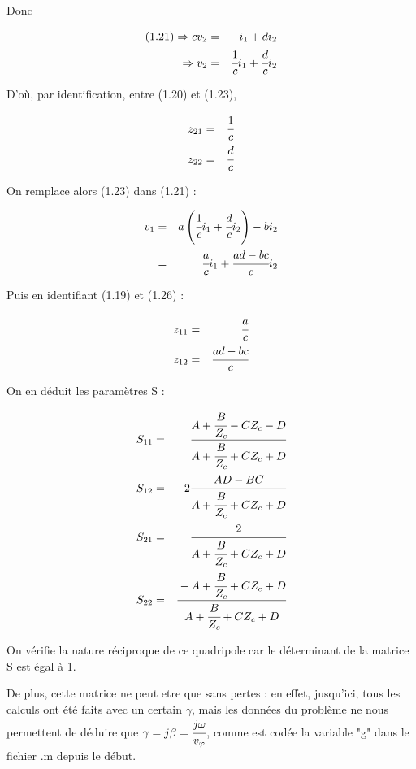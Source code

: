 \documentclass[10pt]{article}
\begin{document}
\begin{itemize}
        Donc

        \begin{eqnarray}
            (1.21) \Rightarrow c v_2 &=& i_1 + d i_2 \nonumber \\
            \Rightarrow v_2 &=& \cfrac{1}{c} i_1 + \cfrac{d}{c} i_2
        \end{eqnarray}

        D'où, par identification, entre (1.20) et (1.23), 

        \begin{eqnarray}
            z_{21} &=& \cfrac{1}{c} \\
            z_{22} &=& \cfrac{d}{c}
        \end{eqnarray}

        On remplace alors (1.23) dans (1.21) :

        \begin{eqnarray}
            v_1 &=& a \left( \cfrac{1}{c} i_1 + \cfrac{d}{c} i_2 \right) - b i_2 \nonumber \\
            &=& \cfrac{a}{c} i_1 + \cfrac{a d - b c}{c} i_2
        \end{eqnarray}

        Puis en identifiant (1.19) et (1.26) :

        \begin{eqnarray}
            z_{11} &=& \cfrac{a}{c} \\
            z_{12} &=& \cfrac{a d - b c}{c}
        \end{eqnarray}

        On en déduit les paramètres S :

        \begin{eqnarray}
            S_{11} &=& \cfrac{A + \cfrac{B}{Z_c} - C Z_c - D}{A+\cfrac{B}{Z_c} +C Z_c +D} \\
            S_{12} &=& 2 \cfrac{A D - B C}{A+\cfrac{B}{Z_c} +C Z_c +D} \\
            S_{21} &=& \cfrac{2}{A+\cfrac{B}{Z_c} +C Z_c +D} \\
            S_{22} &=& \cfrac{-A +\cfrac{B}{Z_c} + C Z_c +D}{A+\cfrac{B}{Z_c} +C Z_c +D}
        \end{eqnarray}

        On vérifie la nature réciproque de ce quadripole car le déterminant de la matrice S est égal à 1.

        De plus, cette matrice ne peut etre que sans pertes : en effet, jusqu'ici, tous les calculs ont été faits avec un certain $\gamma$, mais les données du problème ne nous permettent de déduire que $\gamma = j \beta = \cfrac{j \omega}{v_\varphi}$, comme est codée la variable "g" dans le fichier .m depuis le début.


\end{itemize}
\end{document}
